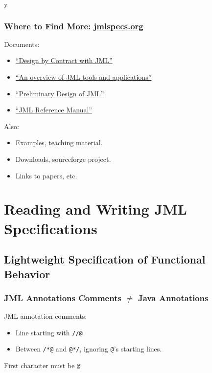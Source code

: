 \if y\MAKEHANDOUTS \documentclass[compress,landscape,handout]{beamer}
\begin{document}
\begin{frame}
\frametitle{Where to Find More: \href{http://www.jmlspecs.org}{jmlspecs.org}}

Documents:
\begin{itemize}
\item
\href{ftp://ftp.cs.iastate.edu/pub/leavens/JML/jmldbc.pdf}{``Design by Contract with JML''}

\item
\href{http://dx.doi.org/10.1007/s10009-004-0167-4}{``An overview of JML tools and applications''}

\item
\href{http://doi.acm.org/10.1145/1127878.1127884}{``Preliminary Design of JML''}

\item
\href{http://www.jmlspecs.org/jmlrefman/jmlrefman_toc.html}{``JML Reference Manual''}
\end{itemize}

Also:
\begin{itemize}
\item
Examples, teaching material.

\item
Downloads, sourceforge project.

\item
Links to papers, etc.
\end{itemize}

\end{frame}

\section[Reading and Writing]{Reading and Writing JML Specifications}

\subsection[Lightweight]{Lightweight Specification of Functional Behavior}

\begin{frame}[fragile]
\frametitle{JML Annotations Comments $\neq$ Java Annotations}

JML annotation comments:
\begin{itemize}
\item
Line starting with \lstinline!//@!

\item
Between \lstinline!/*@! and \lstinline!@*/!,
ignoring \lstinline!@!'s starting lines.
\end{itemize}

First character must be \lstinline!@!

\end{frame}
\end{document}
